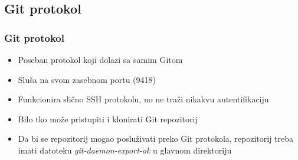\subsection{Git protokol}

\begin{frame}
\frametitle{Git protokol}
\begin{itemize}
	\item Poseban protokol koji dolazi sa samim Gitom
	\item Sluša na svom zasebnom portu (9418)
	\item Funkcionira slično SSH protokolu, no ne traži nikakvu autentifikaciju
	\item Bilo tko može pristupiti i klonirati Git repozitorij
	\item Da bi se repozitorij mogao posluživati preko Git protokola, repozitorij treba imati datoteku \textit{git-daemon-export-ok} u glavnom direktoriju
\end{itemize}
\end{frame}